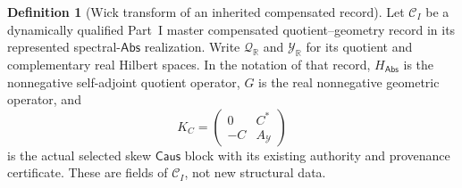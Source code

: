 \documentclass[11pt]{article}
\numberwithin{section}{part}
\theoremstyle{plain}
\theoremstyle{definition}
\newtheorem{definition}[definition]{Definition}
\theoremstyle{remark}
\newcommand{\Caus}{\mathsf{Caus}}
\newcommand{\Abs}{\mathsf{Abs}}
\begin{document}
\begin{definition}[Wick transform of an inherited compensated record]
\label{def:wick-compensated-quotient}
Let \(\mathscr C_I\) be a dynamically qualified Part~I master compensated
quotient--geometry record in its represented spectral-\(\Abs\) realization.
Write \(\mathcal Q_{\mathbb R}\) and \(\mathcal Y_{\mathbb R}\) for its
quotient and complementary real Hilbert spaces.  In the notation of that
record, \(H_{\Abs}\) is the nonnegative self-adjoint quotient operator,
\(G\) is the real nonnegative geometric operator, and
\[
 K_C=\begin{pmatrix}0&C^*\\-C&A_{\mathcal Y}\end{pmatrix}
\]
is the actual selected skew \(\Caus\) block with its existing authority and
provenance certificate.  These are fields of \(\mathscr C_I\), not new
structural data.


\end{definition}
\end{document}
